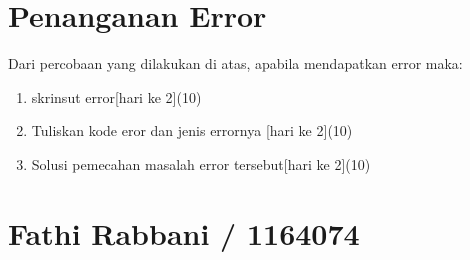 \section{Penanganan Error}
Dari percobaan yang dilakukan di atas, apabila mendapatkan error maka:

\begin{enumerate}
	\item
	skrinsut error[hari ke 2](10)
	\item
Tuliskan kode eror dan jenis errornya [hari ke 2](10)
	\item
Solusi pemecahan masalah error tersebut[hari ke 2](10)

\end{enumerate}


\section{Fathi Rabbani / 1164074}
